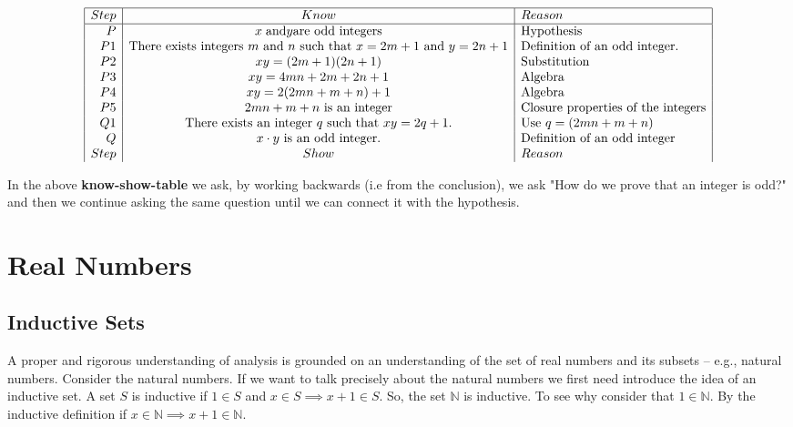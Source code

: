 \documentclass[10pt]{article}
\begin{document}
\begin{center}
    \[
\begin{array}{|r|c|l|} \hline
Step & Know & Reason\\
\hline
P & x\hspace{.1cm} \text{and} y \text{are odd integers} & \text{Hypothesis}\\
P1 & \text{There exists integers $m$ and $n$ such that $x = 2m + 1$ and $y = 2n + 1$}  & \text{Definition of an odd integer.} \\
P2 & xy = (2m + 1)(2n + 1) & \text{Substitution}\\
P3 & xy = 4mn + 2m + 2n + 1 & \text{Algebra} \\
P4 & xy = 2(2mn + m + n) + 1 & \text{Algebra}\\
P5 & \text{$2mn + m + n$ is an integer} & \text{Closure properties of the integers}\\
Q1 & \text{There exists an integer $q$ such that $xy = 2q + 1.$}  & \text{Use $q = (2mn + m + n)$}\\
Q & \text{$ x \cdot y$ is an odd integer.} & \text{Definition of an odd integer}\\
Step & Show & Reason
\end{array}
\]
\end{center}

In the above \textbf{know-show-table} we ask, by working backwards (i.e from the conclusion), we ask "How do we prove that an integer is odd?" and then we continue asking the same question until we can connect it with the hypothesis.



\section{Real Numbers}

\subsection{Inductive Sets}
A proper and rigorous understanding of analysis is grounded on an understanding of the set of real numbers and its subsets -- e.g., natural numbers. Consider the natural numbers. If we want to talk precisely about the natural numbers we first need introduce the idea of an inductive set. A set $S$ is inductive if $1 \in S$ and $x \in S \implies x+1 \in S$. So, the set $\mathbb{N}$ is inductive. To see why consider that $1 \in \mathbb{N}$. By the inductive definition if $x \in \mathbb{N} \implies x+1 \in \mathbb{N}$.
\end{document}
